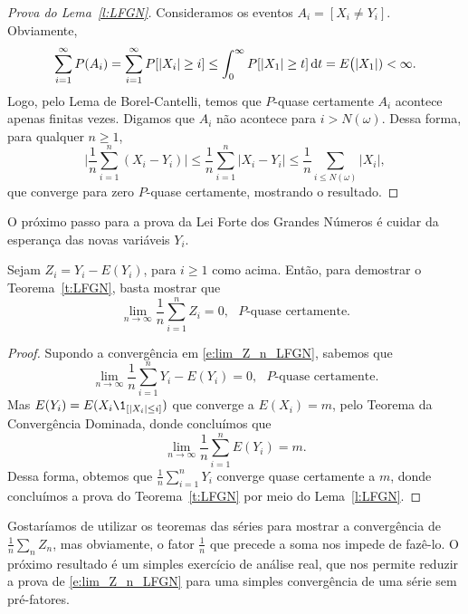 \begin{topics}
\begin{proof}[Prova do Lema~\ref{l:LFGN}]
  Consideramos os eventos $A_i = [X_i \neq Y_i]$.
  Obviamente,
  \begin{equation}
  \sum_{i=1}^{\infty} P(A_i) = \sum_{i=1}^{\infty} P[|X_i| \geq i] \leq
  \int_0^\infty P[|X_1| \geq t] \mathop{}\!\mathrm{d} t = E\big(|X_1|) < \infty.
  \end{equation}
  Logo, pelo Lema de Borel-Cantelli, temos que $P$-quase certamente $A_i$ acontece apenas finitas vezes.
  Digamos que $A_i$ não acontece para $i > N(\omega)$.
  Dessa forma, para qualquer $n \geq 1$,
  \begin{equation}
    \Big|\frac{1}{n}\sum_{i=1}^n (X_i - Y_i)\Big| \leq \frac{1}{n}\sum_{i=1}^n |X_i - Y_i| \leq \frac{1}{n} \sum_{i \leq N(\omega)} |X_i|,
  \end{equation}
  que converge para zero $P$-quase certamente, mostrando o resultado.
\end{proof}

O próximo passo para a prova da Lei Forte dos Grandes Números é cuidar da esperança das novas variáveis $Y_i$.
\begin{lemma}
  \label{l:lim_Z_n_LFGN}
  Sejam $Z_i = Y_i - E(Y_i)$, para $i \geq 1$ como acima.
  Então, para demostrar o Teorema~\ref{t:LFGN}, basta mostrar que
  \begin{equation}
    \label{e:lim_Z_n_LFGN}
    \lim_{n \to \infty}\frac{1}{n} \sum_{i=1}^n Z_i = 0, \text{ $P$-quase certamente.}
  \end{equation}
\end{lemma}

\begin{proof}
  Supondo a convergência em \eqref{e:lim_Z_n_LFGN}, sabemos que
  \begin{equation}
    \lim_{n \to \infty} \frac{1}{n} \sum_{i=1}^n Y_i - E(Y_i) = 0, \text{ $P$-quase certamente.}
  \end{equation}
  Mas $E(Y_i) = E(X_i \1_{[|X_i| \leq i]})$ que converge a $E(X_i) = m$, pelo Teorema da Convergência Dominada, donde concluímos que
  \begin{equation}
    \lim_{n \to \infty} \frac{1}{n} \sum_{i=1}^n E(Y_i) = m.
  \end{equation}
  Dessa forma, obtemos que $\tfrac 1n \sum_{i=1}^n Y_i$ converge quase certamente a $m$, donde concluímos a prova do Teorema~\ref{t:LFGN} por meio do Lema~\ref{l:LFGN}.
\end{proof}

Gostaríamos de utilizar os teoremas das séries para mostrar a convergência de $\tfrac 1n \sum_{n} Z_n$, mas obviamente, o fator $\tfrac 1n$ que precede a soma nos impede de fazê-lo.
O próximo resultado é um simples exercício de análise real, que nos permite reduzir a prova de \eqref{e:lim_Z_n_LFGN} para uma simples convergência de uma série sem pré-fatores.


\end{topics}
